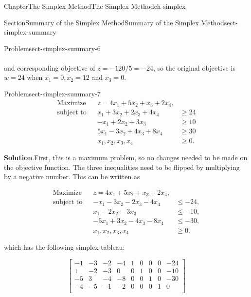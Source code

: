 \documentclass[oneside,10pt,]{book}
\newcommand{\blocktitlefont}{\relax}
\numberwithin{equation}{section}
\newcommand{\amp}{&}
\begin{document}
\begin{chapterptx}{Chapter}{The Simplex Method}{}{The Simplex Method}{}{}{ch-simplex}
\begin{sectionptx}{Section}{Summary of the Simplex Method}{}{Summary of the Simplex Method}{}{}{sect-simplex-summary}
\begin{problem}{Problem}{}{sect-simplex-summary-6}
\begin{align*}
\end{align*}
%
\par
and corresponding objective of \(z = -120/5 = -24\), so the original objective is \(w = 24\) when \(x_1 = 0, x_2 = 12\) and \(x_3 = 0\).%
\end{problem}
\begin{problem}{Problem}{}{sect-simplex-summary-7}%
%
\begin{equation*}
\begin{aligned} \text{Maximize} \amp \amp z = 4x_1 +5x_2 + x_3 + 2x_4, \amp\\ \text{subject to} \amp \amp x_1 +3 x_2 + 2 x_3 + 4 x_4 \amp \geq 24 \\ \amp \amp - x_1 + 2x_2 + 3x_3  \amp \geq 10 \\ \amp \amp 5 x_1 -3x_2 +4 x_3 + 8x_4 \amp \geq 30 \\ \amp \amp x_1, x_2, x_3, x_4 \amp \geq 0.
\end{aligned}
\end{equation*}
%
\par\smallskip%
\noindent\textbf{\blocktitlefont Solution}.\hypertarget{sect-simplex-summary-7-2}{}\quad{}First, this is a maximum problem, so no changes needed to be made on the objective function. The three inequalities need to be flipped by multiplying by a negative number. This can be written as%
\par
%
\begin{equation*}
\begin{aligned} \text{Maximize} \amp \amp z = 4x_1 +5x_2 + x_3 + 2x_4, \amp\\ \text{subject to} \amp \amp -x_1 - 3 x_2 - 2 x_3 - 4 x_4 \amp \leq -24, \\ \amp \amp x_1 - 2x_2 - 3x_3  \amp \leq -10, \\ \amp \amp -5 x_1 +3x_2 - 4 x_3 - 8x_4 \amp \leq -30, \\ \amp \amp x_1, x_2, x_3, x_4 \amp \geq 0.
\end{aligned}
\end{equation*}
%
\par
which has the following simplex tableau:%
\par
%
\begin{equation*}
\left[\begin{array}{rrrr|rrrr|r} -1 \amp -3 \amp -2 \amp -4 \amp 1 \amp 0 \amp 0 \amp 0 \amp -24\\ 1 \amp -2 \amp -3 \amp 0 \amp 0 \amp 1 \amp 0 \amp 0 \amp -10\\ -5 \amp 3 \amp -4 \amp -8 \amp 0 \amp 0 \amp 1 \amp 0 \amp -30\\ \hline -4 \amp -5 \amp -1 \amp -2 \amp 0 \amp 0 \amp 0 \amp 1 \amp 0\\ \end{array} \right]

\end{equation*}
\end{problem}
\end{sectionptx}
\end{chapterptx}
\end{document}
